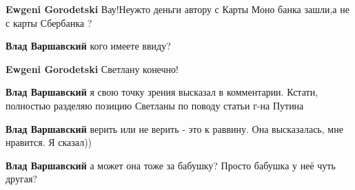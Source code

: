 \begin{itemize}
\begin{itemize}
 
\textbf{Ewgeni Gorodetski} Вау!Неужто деньги автору с Карты Моно банка зашли,а не с карты Сбербанка ?

 
\textbf{Влад Варшавский} кого имеете ввиду?

 
\textbf{Ewgeni Gorodetski} Светлану конечно!

 
\textbf{Влад Варшавский} я свою точку зрения высказал в комментарии. Кстати, полностью разделяю позицию Светланы по поводу статьи г-на Путина

 
\textbf{Влад Варшавский} верить или не верить - это к раввину. Она высказалась, мне нравится. Я сказал))

 
\textbf{Влад Варшавский} а может она тоже за бабушку? Просто бабушка у неё чуть другая?
\end{itemize}


\end{itemize}
